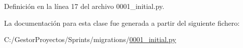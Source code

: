 Definición en la línea 17 del archivo 0001\+\_\+initial.\+py.



La documentación para esta clase fue generada a partir del siguiente fichero\+:\begin{DoxyCompactItemize}
\item 
C\+:/\+Gestor\+Proyectos/\+Sprints/migrations/\hyperlink{_sprints_2migrations_20001__initial_8py}{0001\+\_\+initial.\+py}\end{DoxyCompactItemize}

